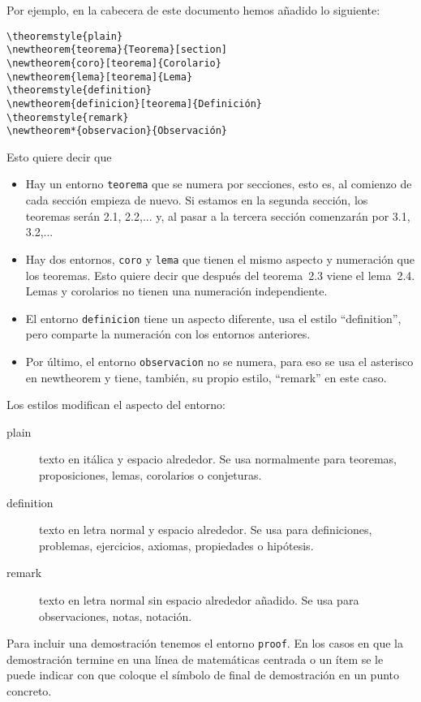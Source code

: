\documentclass{article}
\numberwithin{equation}{section}
\theoremstyle{plain}
\theoremstyle{definition}
\theoremstyle{remark}
\begin{document}
Por ejemplo, en la cabecera de este documento hemos añadido lo siguiente:
\begin{verbatim}
\theoremstyle{plain}
\newtheorem{teorema}{Teorema}[section]
\newtheorem{coro}[teorema]{Corolario}
\newtheorem{lema}[teorema]{Lema}
\theoremstyle{definition}
\newtheorem{definicion}[teorema]{Definición}
\theoremstyle{remark}
\newtheorem*{observacion}{Observación} 
\end{verbatim}
Esto quiere decir que 
\begin{itemize}
	\item Hay un entorno \texttt{teorema} que se numera por secciones, esto es, al comienzo de cada sección empieza de nuevo. Si estamos en la segunda sección, los teoremas serán 2.1, 2.2,... y, al pasar a la tercera sección comenzarán por 3.1, 3.2,...
	\item Hay dos entornos, \texttt{coro} y \texttt{lema} que tienen el mismo aspecto y numeración que los teoremas. Esto quiere decir que después del teorema~2.3 viene el lema~2.4. Lemas y corolarios no tienen una numeración independiente.
	\item El entorno \texttt{definicion} tiene un aspecto diferente, usa el estilo ``definition'', pero comparte la numeración con los entornos anteriores.
	\item Por último, el entorno \texttt{observacion} no se numera, para eso se usa el asterisco en newtheorem y tiene, también, su propio estilo, ``remark'' en este caso.
\end{itemize}

Los estilos modifican el aspecto del entorno:
\begin{description}
    \item[plain] texto en itálica y espacio alrededor. Se usa normalmente para teoremas, proposiciones, lemas, corolarios o conjeturas.
    \item[definition] texto en letra normal y espacio alrededor. Se usa para definiciones, problemas, ejercicios, axiomas, propiedades o hipótesis.
    \item[remark] texto en letra normal sin espacio alrededor añadido. Se usa para observaciones, notas, notación. 
\end{description}

Para incluir una demostración tenemos el entorno \texttt{proof}. En los casos en que la demostración termine en una línea de matemáticas centrada o un ítem se le puede indicar con \texttt{\qedhere} que coloque el símbolo de final de demostración en un punto concreto.
\end{document}
